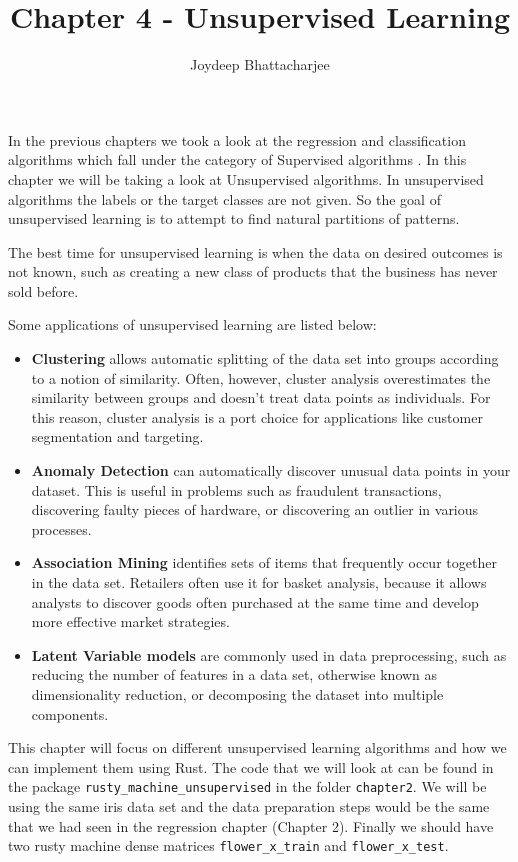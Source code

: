\documentclass{book}
\title{Chapter 4 - Unsupervised Learning}
\author{Joydeep Bhattacharjee}
\begin{document}
\maketitle

In the previous chapters we took a look at the regression and classification algorithms which fall under the category of Supervised algorithms\cite{UL:1} . In this chapter we will be taking a look at Unsupervised algorithms. In unsupervised algorithms the labels or the target classes are not given. So the goal of unsupervised learning is to attempt to find natural partitions of patterns. 

The best time for unsupervised learning is when the data on desired outcomes is not known, such as creating a new class of products that the business has never sold before.

Some applications of unsupervised learning are listed below:

\begin{itemize}
	\item \textbf{Clustering} allows automatic splitting of the data set into groups according to a notion of similarity. Often, however, cluster analysis overestimates the similarity between groups and doesn't treat data points as individuals. For this reason, cluster analysis is a port choice for applications like customer segmentation and targeting.
	\item \textbf{Anomaly Detection} can automatically discover unusual data points in your dataset. This is useful in problems such as fraudulent transactions, discovering faulty pieces of hardware, or discovering an outlier in various processes.
	\item \textbf{Association Mining} identifies sets of items that frequently occur together in the data set. Retailers often use it for basket analysis, because it allows analysts to discover goods often purchased at the same time and develop more effective market strategies.
	\item \textbf{Latent Variable models} are commonly used in data preprocessing, such as reducing the number of features in a data set, otherwise known as dimensionality reduction, or decomposing the dataset into multiple components.
\end{itemize}
This chapter will focus on different unsupervised learning algorithms and how we can implement them using Rust. The code that we will look at can be found in the package \lstinline{rusty_machine_unsupervised} in the folder \lstinline{chapter2}. We will be using the same iris data set and the data preparation steps would be the same that we had seen in the regression chapter (Chapter 2). Finally we should have two rusty machine dense matrices \lstinline{flower_x_train} and \lstinline{flower_x_test}.
\end{document}

